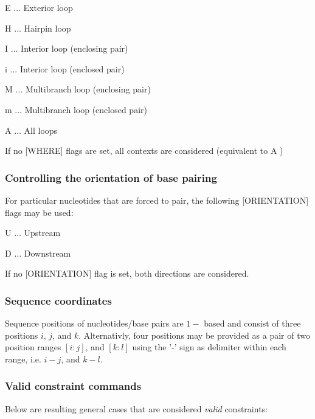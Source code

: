 \begin{DoxyItemize}
\item {\ttfamily E} $ \ldots $ Exterior loop
\item {\ttfamily H} $ \ldots $ Hairpin loop
\item {\ttfamily I} $ \ldots $ Interior loop (enclosing pair)
\item {\ttfamily i} $ \ldots $ Interior loop (enclosed pair)
\item {\ttfamily M} $ \ldots $ Multibranch loop (enclosing pair)
\item {\ttfamily m} $ \ldots $ Multibranch loop (enclosed pair)
\item {\ttfamily A} $ \ldots $ All loops
\end{DoxyItemize}

If no {\ttfamily }\mbox{[}W\-H\-E\-R\-E\mbox{]} flags are set, all contexts are considered (equivalent to {\ttfamily A} )\hypertarget{file_formats_const_file_orientation}{}\subsubsection{Controlling the orientation of base pairing}\label{file_formats_const_file_orientation}
For particular nucleotides that are forced to pair, the following {\ttfamily }\mbox{[}O\-R\-I\-E\-N\-T\-A\-T\-I\-O\-N\mbox{]} flags may be used\-:
\begin{DoxyItemize}
\item {\ttfamily U} $ \ldots $ Upstream
\item {\ttfamily D} $ \ldots $ Downstream
\end{DoxyItemize}

If no {\ttfamily }\mbox{[}O\-R\-I\-E\-N\-T\-A\-T\-I\-O\-N\mbox{]} flag is set, both directions are considered.\hypertarget{file_formats_const_file_seq_coords}{}\subsubsection{Sequence coordinates}\label{file_formats_const_file_seq_coords}
Sequence positions of nucleotides/base pairs are $ 1- $ based and consist of three positions $ i $, $ j $, and $ k $. Alternativly, four positions may be provided as a pair of two position ranges $ [i:j] $, and $ [k:l] $ using the '-\/' sign as delimiter within each range, i.\-e. $ i-j $, and $ k-l $.\hypertarget{file_formats_const_file_syntax}{}\subsubsection{Valid constraint commands}\label{file_formats_const_file_syntax}
Below are resulting general cases that are considered {\itshape valid} constraints\-:


